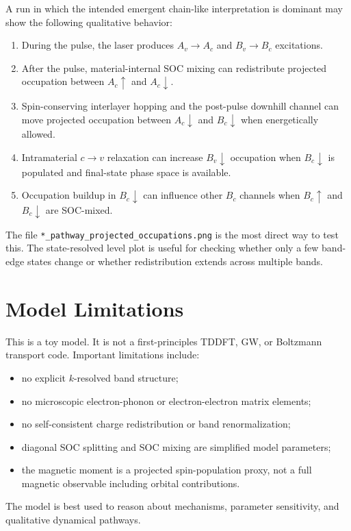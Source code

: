 \documentclass[11pt,a4paper]{article}
\begin{document}
A run in which the intended emergent chain-like interpretation is dominant may show the following qualitative behavior:
\begin{enumerate}[leftmargin=2em]
  \item During the pulse, the laser produces $A_v\rightarrow A_c$ and $B_v\rightarrow B_c$ excitations.
  \item After the pulse, material-internal SOC mixing can redistribute projected occupation between $A_c\uparrow$ and $A_c\downarrow$.
  \item Spin-conserving interlayer hopping and the post-pulse downhill channel can move projected occupation between $A_c\downarrow$ and $B_c\downarrow$ when energetically allowed.
  \item Intramaterial $c\rightarrow v$ relaxation can increase $B_v\downarrow$ occupation when $B_c\downarrow$ is populated and final-state phase space is available.
  \item Occupation buildup in $B_c\downarrow$ can influence other $B_c$ channels when $B_c\uparrow$ and $B_c\downarrow$ are SOC-mixed.
\end{enumerate}
The file \texttt{*\_pathway\_projected\_occupations.png} is the most direct way to test this.  The state-resolved level plot is useful for checking whether only a few band-edge states change or whether redistribution extends across multiple bands.

\section{Model Limitations}

This is a toy model.  It is not a first-principles TDDFT, GW, or Boltzmann transport code.  Important limitations include:
\begin{itemize}[leftmargin=2em]
  \item no explicit $k$-resolved band structure;
  \item no microscopic electron-phonon or electron-electron matrix elements;
  \item no self-consistent charge redistribution or band renormalization;
  \item diagonal SOC splitting and SOC mixing are simplified model parameters;
  \item the magnetic moment is a projected spin-population proxy, not a full magnetic observable including orbital contributions.
\end{itemize}
The model is best used to reason about mechanisms, parameter sensitivity, and qualitative dynamical pathways.
\end{document}

